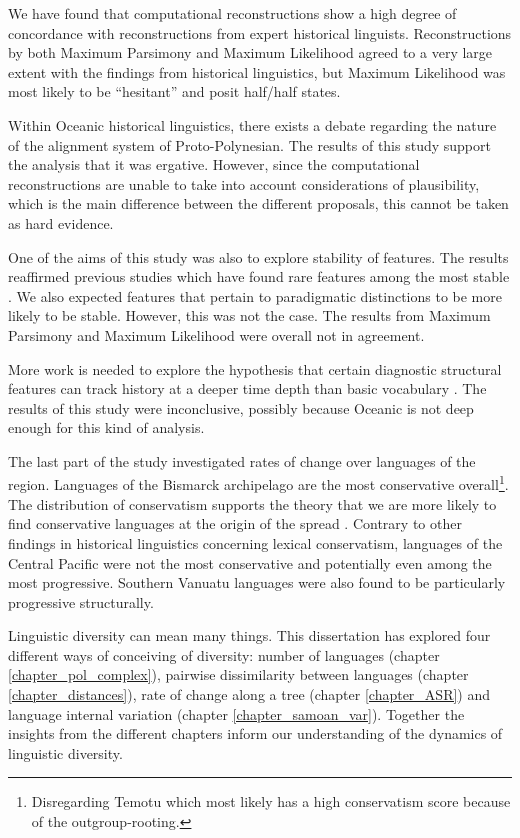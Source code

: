 \documentclass[draft,10pt]{article} %
\begin{document}
We have found that computational reconstructions show a high degree of concordance with reconstructions from expert historical linguists. Reconstructions by both Maximum Parsimony and Maximum Likelihood agreed to a very large extent with the findings from historical linguistics, but Maximum Likelihood was most likely to be ``hesitant'' and posit half/half states.

Within Oceanic historical linguistics, there exists a debate regarding the nature of the alignment system of Proto-Polynesian. The results of this study support the analysis that it was ergative. However, since the computational reconstructions are unable to take into account considerations of plausibility, which is the main difference between the different proposals, this cannot be taken as hard evidence.

One of the aims of this study was also to explore stability of features. The results reaffirmed previous studies which have found rare features among the most stable \citep{dediu2013some}. We also expected features that pertain to paradigmatic distinctions to be more likely to be stable. However, this was not the case. The results from Maximum Parsimony and Maximum Likelihood were overall not in agreement.

More work is needed to explore the hypothesis that certain diagnostic structural features can track history at a deeper time depth than basic vocabulary \citep[c.f.][]{nichols1998origin}. The results of this study were inconclusive, possibly because Oceanic is not deep enough for this kind of analysis.

The last part of the study investigated rates of change over languages of the region. Languages of the Bismarck archipelago are the most conservative overall\footnote{Disregarding Temotu which most likely has a high conservatism score because  of the outgroup-rooting.}. The distribution of conservatism supports the theory that we are more likely to find conservative languages at the origin of the spread  \citep[119]{lynchrosscrowleyinternalsubgroupingoceanic}. Contrary to other findings in historical linguistics concerning lexical conservatism, languages of the Central Pacific were not the most conservative and potentially even among the most progressive. Southern Vanuatu languages were also found to be particularly progressive structurally.



\newpage


Linguistic diversity can mean many things. This dissertation has explored four different ways of conceiving of diversity: number of languages (chapter \ref{chapter_pol_complex}), pairwise dissimilarity between languages (chapter \ref{chapter_distances}), rate of change along a tree (chapter \ref{chapter_ASR}) and language internal variation (chapter \ref{chapter_samoan_var}). Together the insights from the different chapters inform our understanding of the dynamics of linguistic diversity.
\end{document}
